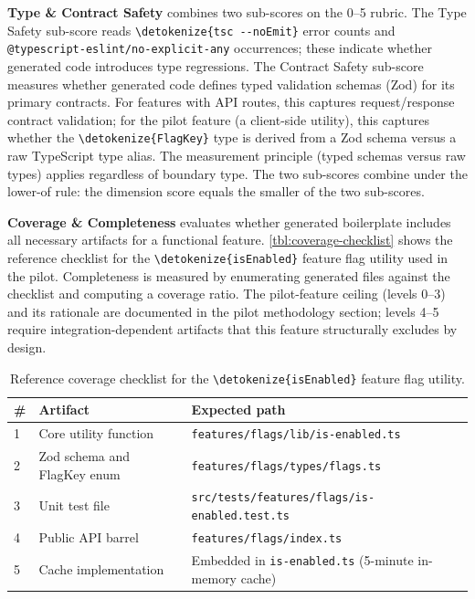 \documentclass[12pt,a4paper]{report}
\newcommand{\code}[1]{\texttt{\nolinkurl{\detokenize{#1}}}}
\newcommand{\pkg}[1]{\texttt{\nolinkurl{#1}}}
\DeclareRobustCommand{\filename}[1]{\bgroup\urlstyle{tt}\nolinkurl{#1}\egroup}
\begin{document}
\textbf{Type \& Contract Safety} combines two sub-scores on the 0--5 rubric. The Type Safety sub-score reads \code{tsc --noEmit} error counts and \pkg{@typescript-eslint/}\pkg{no-explicit-any} occurrences; these indicate whether generated code introduces type regressions. The Contract Safety sub-score measures whether generated code defines typed validation schemas (Zod) for its primary contracts. For features with API routes, this captures request/response contract validation; for the pilot feature (a client-side utility), this captures whether the \code{FlagKey} type is derived from a Zod schema versus a raw TypeScript type alias. The measurement principle (typed schemas versus raw types) applies regardless of boundary type. The two sub-scores combine under the lower-of rule: the dimension score equals the smaller of the two sub-scores.

\textbf{Coverage \& Completeness} evaluates whether generated boilerplate includes all necessary artifacts for a functional feature. \autoref{tbl:coverage-checklist} shows the reference checklist for the \code{isEnabled} feature flag utility used in the pilot. Completeness is measured by enumerating generated files against the checklist and computing a coverage ratio. The pilot-feature ceiling (levels 0--3) and its rationale are documented in the pilot methodology section; levels 4--5 require integration-dependent artifacts that this feature structurally excludes by design.

\begin{table}[ht]
\centering
\footnotesize
\renewcommand{\arraystretch}{1.25}
\caption{Reference coverage checklist for the \code{isEnabled} feature flag utility.}
\label{tbl:coverage-checklist}
\begin{tabular}{@{}p{0.7cm}p{3.3cm}>{\raggedright\arraybackslash}p{9cm}@{}}
\toprule
\# & Artifact & Expected path \\
\midrule
1 & Core utility function & \filename{features/flags/lib/is-enabled.ts} \\
2 & Zod schema and FlagKey enum & \filename{features/flags/types/flags.ts} \\
3 & Unit test file & \filename{src/tests/features/flags/is-enabled.test.ts} \\
4 & Public API barrel & \filename{features/flags/index.ts} \\
5 & Cache implementation & Embedded in \filename{is-enabled.ts} (5-minute in-memory cache) \\
\bottomrule
\end{tabular}

\renewcommand{\arraystretch}{1}
\end{table}
\end{document}
